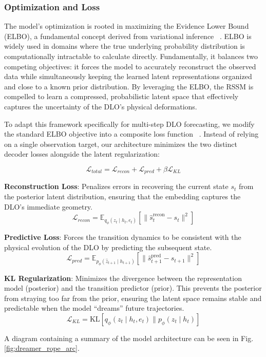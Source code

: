 \documentclass[letterpaper, 10 pt, conference]{ieeeconf}  %
\begin{document}
\subsubsection{Optimization and Loss}
The model's optimization is rooted in maximizing the Evidence Lower Bound (ELBO), a fundamental concept derived from variational inference ~\cite{kingma_auto-encoding_2022}. ELBO is widely used in domains where the true underlying probability distribution is computationally intractable to calculate directly. Fundamentally, it balances two competing objectives: it forces the model to accurately reconstruct the observed data while simultaneously keeping the learned latent representations organized and close to a known prior distribution. By leveraging the ELBO, the RSSM is compelled to learn a compressed, probabilistic latent space that effectively captures the uncertainty of the DLO's physical deformations. 

To adapt this framework specifically for multi-step DLO forecasting, we modify the standard ELBO objective into a composite loss function ~\cite{kingma_auto-encoding_2022}. Instead of relying on a single observation target, our architecture minimizes the two distinct decoder losses alongside the latent regularization:

$$\mathcal{L}_{total} = \mathcal{L}_{recon} + \mathcal{L}_{pred} + \beta \mathcal{L}_{KL}$$ 

\textbf{Reconstruction Loss}: Penalizes errors in recovering the current state $s_t$ from the posterior latent distribution, ensuring that the embedding captures the DLO's immediate geometry.
    $$\mathcal{L}_{recon} = \mathbb{E}_{q_\phi(z_t \mid h_t, e_t)} [ \| \hat{s}_t^{\text{recon}} - s_t \|^2 ]$$

\textbf{Predictive Loss}: Forces the transition dynamics to be consistent with the physical evolution of the DLO by predicting the subsequent state.
    $$\mathcal{L}_{pred} = \mathbb{E}_{p_\phi(\hat{z}_{t+1} \mid h_{t+1})} [ \| \hat{s}_{t+1}^{\text{pred}} - s_{t+1} \|^2 ]$$

\textbf{KL Regularization}: Minimizes the divergence between the representation model (posterior) and the transition predictor (prior). This prevents the posterior from straying too far from the prior, ensuring the latent space remains stable and predictable when the model ``dreams'' future trajectories.
    $$\mathcal{L}_{KL} = \text{KL}[q_\phi(z_t \mid h_t, e_t) \| p_\phi(z_t \mid h_t)]$$

A diagram containing a summary of the model architecture can be seen in Fig. \ref{fig:dreamer_rope_arc}.
\end{document}
